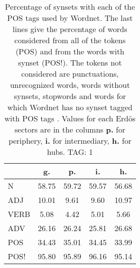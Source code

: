 \begin{table}[h!]
\begin{center}
\begin{tabular}{| l | c | c | c | c |}\hline
 & g. & p. & i. & h. \\\hline
N & 58.75  & 59.72  & 59.57  & 56.68 \\\hline
ADJ & 10.01  & 9.61  & 9.60  & 10.97 \\\hline
VERB & 5.08  & 4.42  & 5.01  & 5.66 \\\hline
ADV & 26.16  & 26.24  & 25.81  & 26.68 \\\hline
POS & 34.43  & 35.01  & 34.45  & 33.99 \\\hline
POS! & 95.80  & 95.89  & 96.16  & 95.14 \\\hline
\end{tabular}
\caption{Percentage of synsets with each of the POS tags used by Wordnet. The last lines give the percentage of words considered from all of the tokens (POS) and from the words with synset (POS!). The tokens not considered are punctuations, unrecognized words, words without synsets, stopwords and words for which Wordnet has no synset  tagged with POS tags . Values for each Erd\"os sectors are in the columns {{\bf p.}} for periphery, {{\bf i.}} for intermediary, {{\bf h.}} for hubs. TAG: 1}
\end{center}
\end{table}